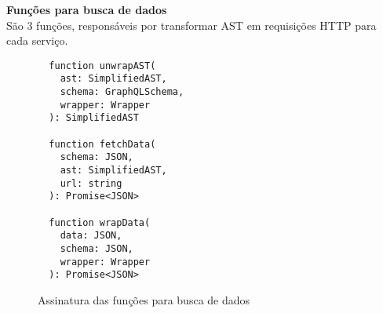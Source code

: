 \textbf{Funções para busca de dados} \\

São 3 funções, responsáveis por transformar AST em requisições HTTP para cada serviço.

\begin{figure}[H]
  \centering
  \begin{verbatim}
  function unwrapAST(
    ast: SimplifiedAST, 
    schema: GraphQLSchema, 
    wrapper: Wrapper
  ): SimplifiedAST

  function fetchData(
    schema: JSON, 
    ast: SimplifiedAST, 
    url: string
  ): Promise<JSON>

  function wrapData(
    data: JSON, 
    schema: JSON, 
    wrapper: Wrapper
  ): Promise<JSON>
  \end{verbatim}
  \caption{Assinatura das funções para busca de dados}
\end{figure}
